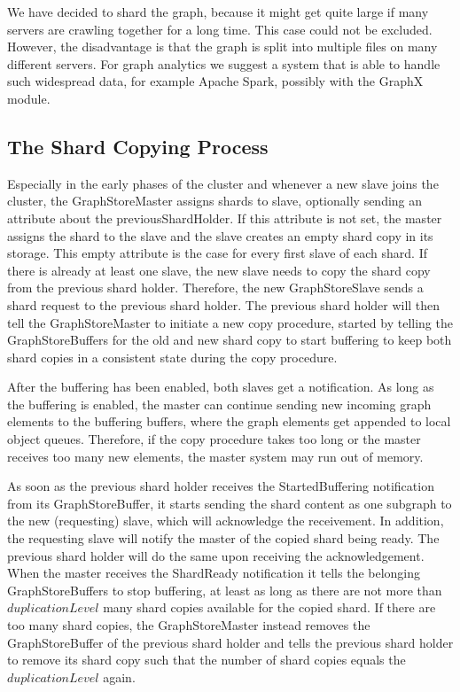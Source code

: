 \documentclass{sigchi}
\begin{document}
We have decided to shard the graph, because it might get quite large if many servers are crawling together for a long time. This case could not be excluded. However, the disadvantage is that the graph is split into multiple files on many different servers. For graph analytics we suggest a system that is able to handle such widespread data, for example Apache Spark, possibly with the GraphX module.

\subsection{The Shard Copying Process}

Especially in the early phases of the cluster and whenever a new slave joins the cluster, the GraphStoreMaster assigns shards to slave, optionally sending an attribute about the previousShardHolder. If this attribute is not set, the master assigns the shard to the slave and the slave creates an empty shard copy in its storage. This empty attribute is the case for every first slave of each shard. If there is already at least one slave, the new slave needs to copy the shard copy from the previous shard holder. Therefore, the new GraphStoreSlave sends a shard request to the previous shard holder. The previous shard holder will then tell the GraphStoreMaster to initiate a new copy procedure, started by telling the GraphStoreBuffers for the old and new shard copy to start buffering to keep both shard copies in a consistent state during the copy procedure. 

After the buffering has been enabled, both slaves get a notification. As long as the buffering is enabled, the master can continue sending new incoming graph elements to the buffering buffers, where the graph elements get appended to local object queues. Therefore, if the copy procedure takes too long or the master receives too many new elements, the master system may run out of memory.

As soon as the previous shard holder receives the StartedBuffering notification from its GraphStoreBuffer, it starts sending the shard content as one subgraph to the new (requesting) slave, which will acknowledge the receivement. In addition, the requesting slave will notify the master of the copied shard being ready. The previous shard holder will do the same upon receiving the acknowledgement. When the master receives the ShardReady notification it tells the belonging GraphStoreBuffers to stop buffering, at least as long as there are not more than $duplicationLevel$ many shard copies available for the copied shard. If there are too many shard copies, the GraphStoreMaster instead removes the GraphStoreBuffer of the previous shard holder and tells the previous shard holder to remove its shard copy such that the number of shard copies equals the $duplicationLevel$ again.
\end{document}
